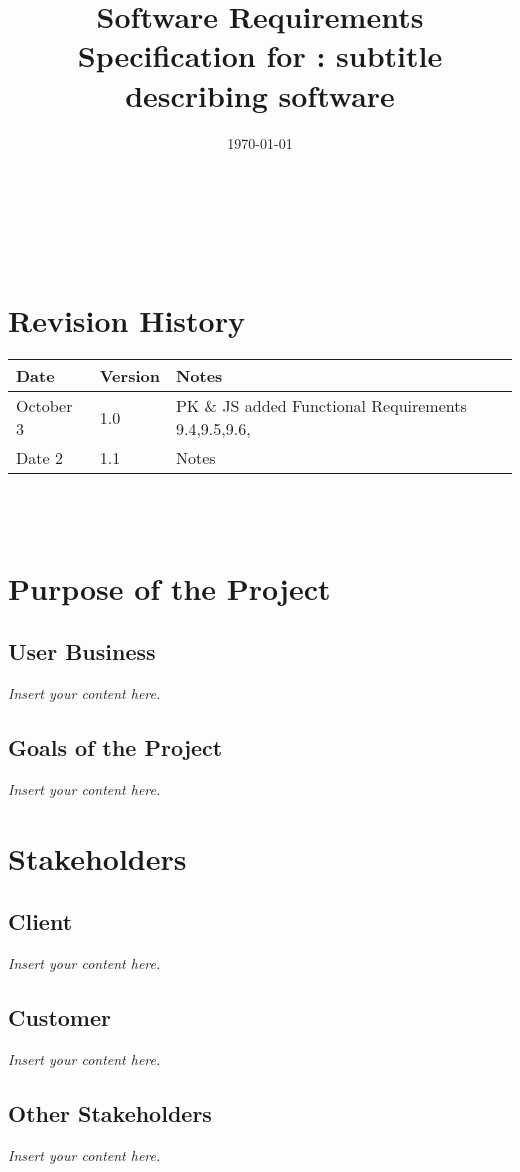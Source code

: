 \documentclass[12pt]{article}
\newcommand{\lips}{\textit{Insert your content here.}}
\begin{document}
\title{Software Requirements Specification for \progname: subtitle describing software} 
\author{\authname}
\date{\today}
	
\maketitle

~\newpage


\tableofcontents

~\newpage

\section*{Revision History}

\begin{tabularx}{\textwidth}{p{3cm}p{2cm}X}
\toprule {\textbf{Date}} & {\textbf{Version}} & {\textbf{Notes}}\\
\midrule
October 3 & 1.0 & PK \& JS added Functional Requirements 9.4,9.5,9.6,\\
Date 2 & 1.1 & Notes\\
\bottomrule
\end{tabularx}

~\\

~\newpage
\section{Purpose of the Project}
\subsection{User Business}
\lips
\subsection{Goals of the Project}
\lips
\section{Stakeholders}
\subsection{Client}
\lips
\subsection{Customer}
\lips
\subsection{Other Stakeholders}
\lips
\end{document}
